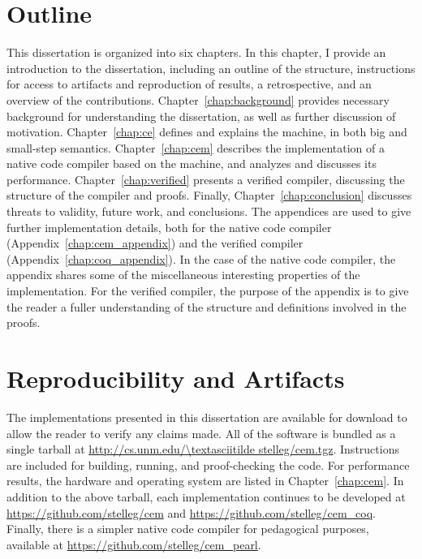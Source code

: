 \section{Outline}

This dissertation is organized into six chapters. In this chapter, I provide
an introduction to the dissertation, including an outline of the structure,
instructions for access to artifacts and reproduction of results, a
retrospective, and an overview of the contributions.
Chapter~\ref{chap:background} provides necessary background for understanding
the dissertation, as well as further discussion of motivation. 
Chapter~\ref{chap:ce} defines and explains the \ce machine, in both big and
small-step semantics. Chapter~\ref{chap:cem} describes the implementation
of a native code compiler based on the \ce machine, and analyzes and discusses
its performance. Chapter~\ref{chap:verified} presents a verified compiler,
discussing the structure of the compiler and proofs. Finally, 
Chapter~\ref{chap:conclusion} discusses threats to validity, future work, and
conclusions. The appendices are used to give further implementation details,
both for the native code compiler (Appendix~\ref{chap:cem_appendix}) and the
verified compiler (Appendix~\ref{chap:coq_appendix}). In the case of the native
code compiler, the appendix shares some of the miscellaneous interesting
properties of the implementation. For the verified compiler, the purpose of the
appendix is to give the reader a fuller understanding of the structure and
definitions involved in the proofs.

\section{Reproducibility and Artifacts}

The implementations presented in this dissertation are available for download to
allow the reader to verify any claims made. All of the software is bundled as
a single tarball at \url{http://cs.unm.edu/\textasciitilde stelleg/cem.tgz}.
Instructions are included for building, running, and proof-checking the code.
For performance results, the hardware and operating system are listed in
Chapter~\ref{chap:cem}. In addition to the above tarball, each implementation
continues to be developed at \url{https://github.com/stelleg/cem} and
\url{https://github.com/stelleg/cem\_coq}. Finally, there is a simpler native
code compiler for pedagogical purposes, available at
\url{https://github.com/stelleg/cem\_pearl}. 

